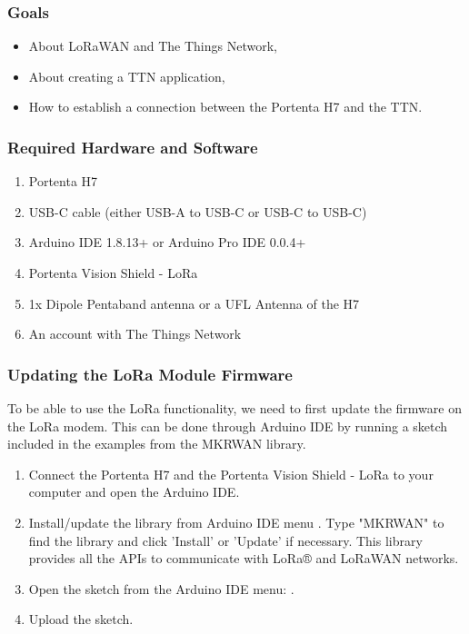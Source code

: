 \subsubsection{Goals}
\begin{itemize}
	\item About LoRaWAN and The Things Network,
	\item About creating a TTN application, 
	\item How to establish a connection between the Portenta H7 and the TTN. \cite{connecting_to_ttn_portenta_vision_shield:2024}
\end{itemize}

\subsubsection {Required Hardware and Software}
\begin{enumerate}
	\item Portenta H7
	\item USB-C cable (either USB-A to USB-C or USB-C to USB-C)
	\item Arduino IDE 1.8.13+ or Arduino Pro IDE 0.0.4+
	\item Portenta Vision Shield - LoRa
	\item 1x Dipole Pentaband antenna or a UFL Antenna of the H7 
	\item An account with The Things Network \cite{connecting_to_ttn_portenta_vision_shield:2024}
\end{enumerate}

\subsubsection {Updating the LoRa Module Firmware}
To be able to use the LoRa functionality, we need to first update the firmware on the LoRa modem. This can be done through Arduino IDE by running a sketch included in the examples from the MKRWAN library.

\begin{enumerate}
	\item Connect the Portenta H7 and the Portenta Vision Shield - LoRa to your computer and open the Arduino IDE.
	\item Install/update the  library from Arduino IDE menu . Type "MKRWAN" to find the library and click 'Install' or 'Update' if necessary. This library provides all the APIs to communicate with LoRa® and LoRaWAN networks.
	\item Open the  sketch from the Arduino IDE menu: .
	\item Upload the sketch. \cite{connecting_to_ttn_portenta_vision_shield:2024}
\end{enumerate}

